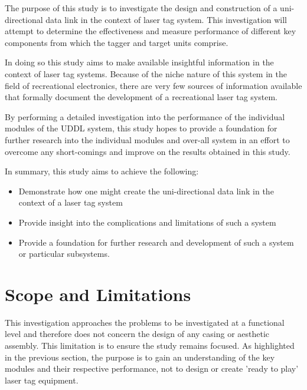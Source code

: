 

The purpose of this study is to investigate the design and construction of a uni-directional data link in the context of laser tag system. This investigation will attempt to determine the effectiveness and measure performance of different key components from which the tagger and target units comprise.

In doing so this study aims to make available insightful information in the context of laser tag systems. Because of the niche nature of this system in the field of recreational electronics, there are very few sources of information available that formally document the development of a recreational laser tag system.

By performing a detailed investigation into the performance of the individual modules of the UDDL system, this study hopes to provide a foundation for further research into the individual modules and over-all system in an effort to overcome any short-comings and improve on the results obtained in this study.

In summary, this study aims to achieve the following:

\begin{itemize}
	\item Demonstrate how one might create the uni-directional data link in the context of a laser tag system
	\item Provide insight into the complications and limitations of such a system
	\item Provide a foundation for further research and development of such a system or particular subsystems.
\end{itemize}


\section{Scope and Limitations}

This investigation approaches the problems to be investigated at a functional level and therefore does not concern the design of any casing or aesthetic assembly. This limitation is to ensure the study remains focused. As highlighted in the previous section, the purpose is to gain an understanding of the key modules and their respective performance, not to design or create 'ready to play' laser tag equipment.


